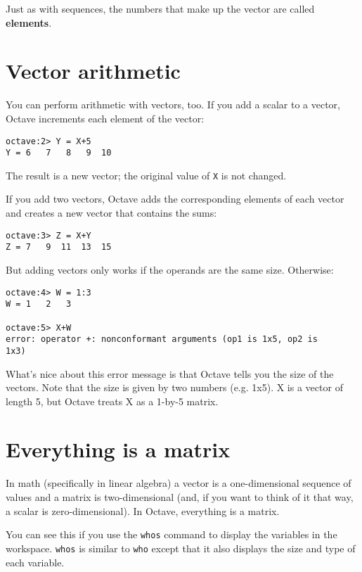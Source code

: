 Just as with sequences, the numbers that make up the vector are called
{\bf elements}.


\section{Vector arithmetic}

You can perform arithmetic with vectors, too. If you add a scalar
to a vector, Octave increments each element of the vector:

\begin{verbatim}
octave:2> Y = X+5
Y = 6   7   8   9  10
\end{verbatim}

The result is a new vector; the original value of {\tt X} is not
changed.

If you add two vectors, Octave adds the corresponding elements of each
vector and creates a new vector that contains the sums:

\begin{verbatim}
octave:3> Z = X+Y
Z = 7   9  11  13  15
\end{verbatim}

But adding vectors only works if the operands are the same size.
Otherwise:

\begin{verbatim}
octave:4> W = 1:3
W = 1   2   3

octave:5> X+W
error: operator +: nonconformant arguments (op1 is 1x5, op2 is 
1x3)
\end{verbatim}

What's nice about this error message is that Octave tells you the size of
the vectors. Note that the size is given by two numbers (e.g. 1x5). X is a
vector of length 5, but Octave treats X as a 1-by-5 matrix.


\section{Everything is a matrix}

In math (specifically in linear algebra) a vector is a one-dimensional
sequence of values and a matrix is two-dimensional (and, if you want
to think of it that way, a scalar is zero-dimensional). In Octave,
everything is a matrix.

You can see this if you use the {\tt whos} command to display the
variables in the workspace. {\tt whos} is similar to {\tt who} except
that it also displays the size and type of each variable.

